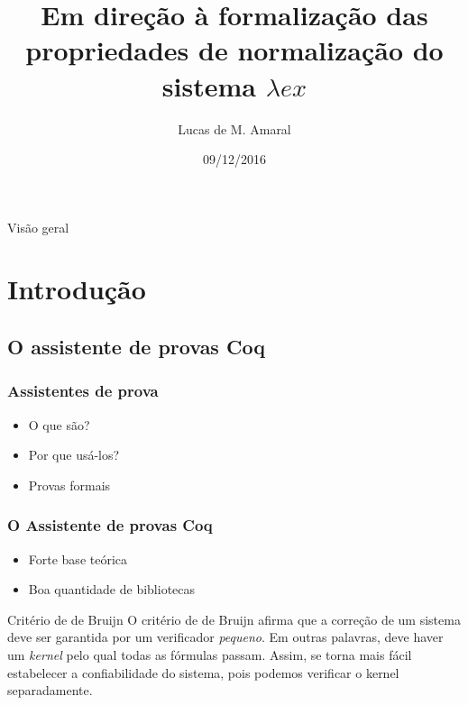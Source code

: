 \documentclass{beamer}
\title[Normalização no sistema $\lambda$ex]{Em direção à formalização das propriedades de normalização do sistema
    $\lambda ex$}
\author{
Lucas de M. Amaral
}
\institute[UnB]{Universidade de Brasilia}
\date{09/12/2016}
\begin{document}


\begin{frame}
\titlepage
\end{frame}

\begin{frame}{Visão geral}
\tableofcontents
\end{frame}

\section{Introdução}

\subsection{O assistente de provas Coq}



\begin{frame}
\frametitle{Assistentes de prova}
\begin{itemize}
    \item O que são? \pause
    \item Por que usá-los?  \pause
    \item Provas formais
\end{itemize}
\end{frame}


\begin{frame}
\frametitle{O Assistente de provas Coq}
\begin{itemize}
    \item Forte base teórica
    \item Boa quantidade de bibliotecas
\end{itemize}

\pause

\begin{block}{ Critério de de Bruijn }
        O critério de de Bruijn afirma que a correção de um sistema deve ser
        garantida por um verificador \emph{pequeno}. Em outras palavras, deve
        haver um \emph{kernel} pelo qual todas as fórmulas passam. Assim, se
        torna mais fácil estabelecer a confiabilidade do sistema, pois podemos
        verificar o kernel separadamente.
    
\end{block} 
\end{frame}
\end{document}
